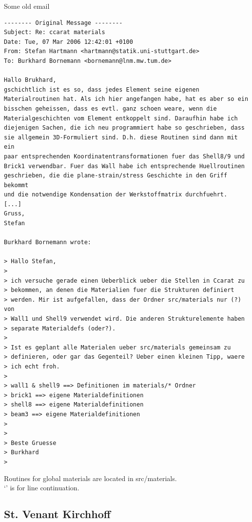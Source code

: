 Some old email
\begin{verbatim}
-------- Original Message --------
Subject: Re: ccarat materials
Date: Tue, 07 Mar 2006 12:42:01 +0100
From: Stefan Hartmann <hartmann@statik.uni-stuttgart.de>
To: Burkhard Bornemann <bornemann@lnm.mw.tum.de>

Hallo Brukhard,
gschichtlich ist es so, dass jedes Element seine eigenen 
Materialroutinen hat. Als ich hier angefangen habe, hat es aber so ein 
bisschen geheissen, dass es evtl. ganz schoen weare, wenn die 
Materialgeschichten vom Element entkoppelt sind. Daraufhin habe ich 
diejenigen Sachen, die ich neu programmiert habe so geschrieben, dass 
sie allgemein 3D-Formuliert sind. D.h. diese Routinen sind dann mit ein 
paar entsprechenden Koordinatentransformationen fuer das Shell8/9 und 
Brick1 verwendbar. Fuer das Wall habe ich entsprechende Huellroutinen 
geschrieben, die die plane-strain/stress Geschichte in den Griff bekommt 
und die notwendige Kondensation der Werkstoffmatrix durchfuehrt.
[...]
Gruss,
Stefan

Burkhard Bornemann wrote:

> Hallo Stefan,
>
> ich versuche gerade einen Ueberblick ueber die Stellen in Ccarat zu 
> bekommen, an denen die Materialien fuer die Strukturen definiert 
> werden. Mir ist aufgefallen, dass der Ordner src/materials nur (?) von 
> Wall1 und Shell9 verwendet wird. Die anderen Strukturelemente haben 
> separate Materialdefs (oder?).
>
> Ist es geplant alle Materialen ueber src/materials gemeinsam zu 
> definieren, oder gar das Gegenteil? Ueber einen kleinen Tipp, waere 
> ich echt froh.
>
> wall1 & shell9 ==> Definitionen im materials/* Ordner
> brick1 ==> eigene Materialdefinitionen
> shell8 ==> eigene Materialdefinitionen
> beam3 ==> eigene Materialdefinitionen
>
>
> Beste Gruesse
> Burkhard
>
\end{verbatim}

Routines for global materials are located in src/materials.\\
`\cnl' is for line continuation.


\subsection{St. Venant Kirchhoff}

